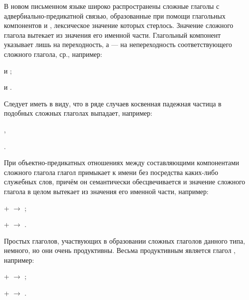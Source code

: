 В новом письменном языке широко распространены сложные глаголы с адвербиально-предикатной связью, образованные при помощи глагольных компонентов  и , лексическое значение которых стерлось. Значение сложного глагола вытекает из значения его именной части. Глагольный компонент  указывает лишь на переходность, а  --- на непереходность соответствующего сложного глагола, ср., например:
\begin{prfsample}
	\item {} и ;
	\item {} и .
\end{prfsample}

Следует иметь в виду, что в ряде случаев косвенная падежная частица в подобных сложных глаголах выпадает, например:
\begin{prfsample}
	\item {},
	\item {}.
\end{prfsample}

При объектно-предикатных отношениях между составляющими компонентами сложного глагола глагол примыкает к имени без посредства каких-либо служебных слов, причём он семантически обесцвечивается и значение сложного глагола в целом вытекает из значения его именной части, например:
\begin{prfsample}
	\item {} +  $\rightarrow$ ;
	\item {} +  $\rightarrow$ .
\end{prfsample}

Простых глаголов, участвующих в образовании сложных глаголов данного типа, немного, но они очень продуктивны. Весьма продуктивным является глагол , например:
\begin{prfsample}
	\item {} +  $\rightarrow$ ;
	\item {} +  $\rightarrow$ .
\end{prfsample}

